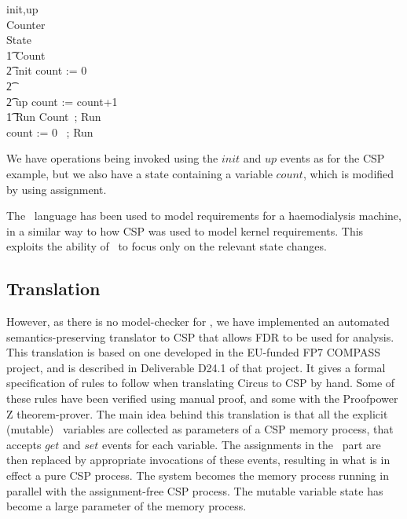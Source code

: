 \begin{circus}
\circchannel init,up \\
\circprocess Counter  \circbegin \\
\circstate State  \\
\t1 Count  \\
\t2 init \then count := 0 \\
\t2 \extchoice \\
\t2 up \then count := count+1 \\
\t1 Run  Count~; Run \\
{} \bullet count := 0 ~; Run \\
\circend
\end{circus}

We have operations being invoked using the $init$ and $up$ events
as for the CSP example, but we also have a state containing a variable $count$,
which is modified by using assignment.


The \Circus\ language has been used to model requirements
for a haemodialysis machine\cite{DBLP:conf/asm/GomesB16},
in a similar way to how CSP was used to model kernel requirements.
This exploits the ability of \Circus\ to focus only on the relevant state changes.

\subsection{Translation}

However, as there is no model-checker for \Circus,
we have implemented an automated semantics-preserving translator to CSP
that allows FDR to be used for analysis.
This translation is based on one developed in the EU-funded FP7 COMPASS project,
and is described in Deliverable D24.1 of that project\cite{compassd241}.
It gives a formal specification of rules to follow when
translating  Circus to CSP by hand.
Some of these rules have been verified using manual proof,
and some with the Proofpower Z theorem-prover\cite{PPZRM}.
The main idea behind this translation is that
all the explicit (mutable) \Circus\ variables are collected as parameters
of a CSP memory process, that accepts $get$ and $set$ events
for each variable. The assignments in the \Circus\ part
are then replaced by appropriate invocations of these events,
resulting in what is in effect a pure CSP process.
The system becomes the memory process running in parallel with the
assignment-free CSP process.
The mutable variable state has become a large parameter of the memory process.

